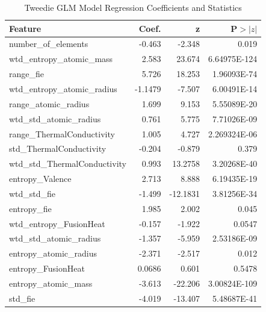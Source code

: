 \documentclass[conference]{IEEEtran}
\begin{document}
\begin{table}[h!]
	\centering
	\caption{Tweedie GLM Model Regression Coefficients and Statistics}
	\footnotesize
	\label{tab:regression_results}
	\begin{tabular}{l r r r}
		\hline
		\textbf{Feature} & \textbf{Coef.} & \textbf{z} & \textbf{P$>|z|$} \\
		\hline
		number\_of\_elements & -0.463 & -2.348 & 0.019 \\
		wtd\_entropy\_atomic\_mass & 2.583 & 23.674 & 6.64975E-124 \\
		range\_fie & 5.726 & 18.253 & 1.96093E-74 \\
		wtd\_entropy\_atomic\_radius & -1.1479 & -7.507 & 6.00491E-14 \\
		range\_atomic\_radius & 1.699 & 9.153 & 5.55089E-20 \\
		wtd\_std\_atomic\_radius & 0.761 & 5.775 & 7.71026E-09 \\
		range\_ThermalConductivity & 1.005 & 4.727 & 2.269324E-06 \\
		std\_ThermalConductivity & -0.204 & -0.879 & 0.379 \\
		wtd\_std\_ThermalConductivity & 0.993 & 13.2758 & 3.20268E-40 \\
		entropy\_Valence & 2.713 & 8.888 & 6.19435E-19 \\
		wtd\_std\_fie & -1.499 & -12.1831 & 3.81256E-34 \\
		entropy\_fie & 1.985 & 2.002 & 0.045 \\
		wtd\_entropy\_FusionHeat & -0.157 & -1.922 & 0.0547 \\
		wtd\_std\_atomic\_radius & -1.357 & -5.959 & 2.53186E-09 \\
		entropy\_atomic\_radius & -2.371 & -2.517 & 0.012 \\
		entropy\_FusionHeat & 0.0686 & 0.601 & 0.5478 \\
		entropy\_atomic\_mass & -3.613 & -22.206 & 3.00824E-109 \\
		std\_fie & -4.019 & -13.407 & 5.48687E-41 \\
		\hline
	\end{tabular}
\end{table}
\end{document}
